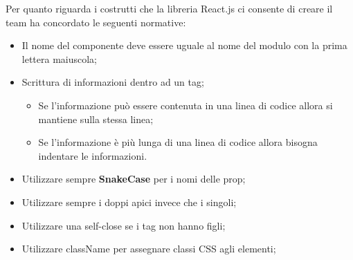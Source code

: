 Per quanto riguarda i costrutti che la libreria React.js ci consente di creare il team ha concordato le seguenti normative:
\begin{itemize}
    \item Il nome del componente deve essere uguale al nome del modulo con la prima lettera maiuscola;
    \item Scrittura di informazioni dentro ad un tag;
    \begin{itemize}
        \item Se l’informazione può essere contenuta in una linea di codice allora si mantiene sulla stessa
        linea;
        \item Se l’informazione è più lunga di una linea di codice allora bisogna indentare le informazioni.
    \end{itemize}
    \item Utilizzare sempre \textbf{SnakeCase} per i nomi delle prop;
    \item Utilizzare sempre i doppi apici invece che i singoli;
    \item Utilizzare una self-close se i tag non hanno figli;
    \item Utilizzare className per assegnare classi CSS agli elementi;
\end{itemize}


